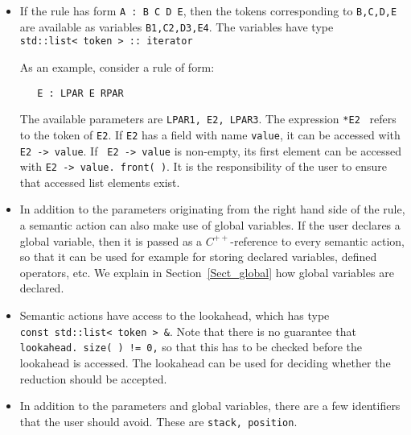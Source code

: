 \documentclass{article}
\begin{document}
\begin{itemize}
\item
   If the rule has form \verb+A : B C D E+, then the
   tokens corresponding to \verb+B,C,D,E+ are available as
   variables \verb+B1,C2,D3,E4+. The variables have type \\
   \verb+std::list< token > :: iterator+
  
   As an example, consider a rule of form: 
\begin{verbatim}
   E : LPAR E RPAR 
\end{verbatim}
   The available parameters are \verb+LPAR1, E2, LPAR3+.
   The expression \verb+*E2 + refers to the token of
   \verb+E2+. If \verb+E2+ has a field with name
   \verb+value+, it can be accessed with
   \verb+E2 -> value+. If \verb+ E2 -> value+ is non-empty,
   its first element can be accessed with
   \verb+E2 -> value. front( )+.
   It is the responsibility of the user to ensure that
   accessed list elements exist.  
\item
   In addition to the parameters originating from the right hand
   side of the rule, a semantic action can also make use of
   global variables. If the user declares a global variable,
   then it is passed as a $ C^{++} $-reference to 
   every semantic action, so that it can be used for example for 
   storing declared variables, defined operators, etc.
   We explain in Section~\ref{Sect_global} how global variables are 
   declared. 
\item
   Semantic actions have access to the lookahead, which has type \\
   \verb+const std::list< token > &+. 
   Note that there is no guarantee that 
   \verb+lookahead. size( ) != 0,+ so that this has to be checked
   before the lookahead is accessed. 
   The lookahead can be used for deciding whether 
   the reduction should be accepted. 

\item
   In addition to the parameters and global variables, there
   are a few identifiers that the user should avoid.
   These are \verb+stack, position+.
\end{itemize}
   
\end{document}
